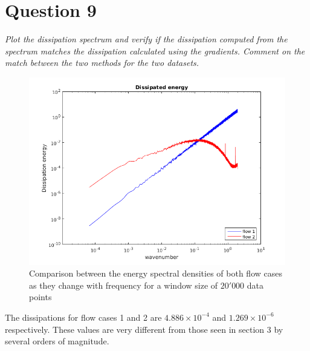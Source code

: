 \section*{Question 9}
\textit{Plot the dissipation spectrum and verify if the dissipation computed from the spectrum matches the dissipation calculated using the gradients. Comment on the match between the two methods for the two datasets.}

\begin{figure}[!ht]
\centering
\includegraphics[scale=0.8]{./TEXT/esd-d.png}
\caption{Comparison between the energy spectral densities of both flow cases as they change with frequency for a window size of $20'000$ data points}
\label{esd-d}
\end{figure}

The dissipations for flow cases 1 and 2 are $4.886 \times 10^{-4}$ and $1.269 \times 10^{-6}$ respectively. These values are very different from those seen in section 3 by several orders of magnitude.